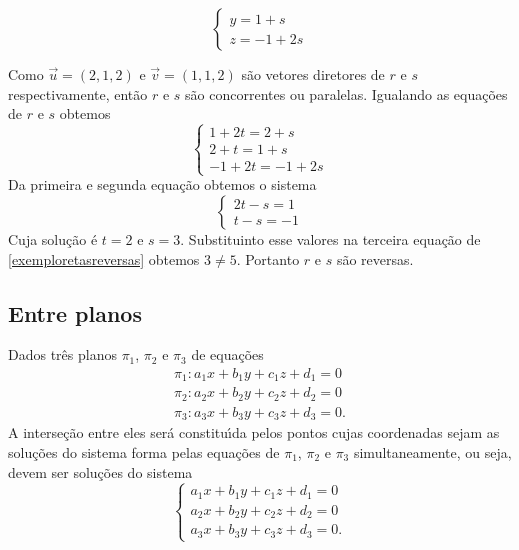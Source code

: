 \begin{exemplos}
\begin{enumerate}
\[\begin{cases}
                y = 1 + s\\
                z = -1 + 2s
            \end{cases}
        \]
        \begin{solucao}
            Como $\vec{u} = (2,1,2)$ e $\vec{v} = (1,1,2)$ s\~ao vetores diretores de $r$ e $s$ respectivamente, ent\~ao $r$ e $s$ s\~ao concorrentes ou paralelas. Igualando as equa\c{c}\~oes de $r$ e $s$ obtemos
            \begin{equation}\label{exemploretasreversas}
                \begin{cases}
                    1 + 2t = 2 + s\\
                    2 + t = 1 + s\\
                    -1 + 2t = -1 + 2s    
                \end{cases}
            \end{equation}
            Da primeira e segunda equa\c{c}\~ao obtemos o sistema
            \[
                \begin{cases}
                    2t - s = 1\\
                    t - s = -1
                \end{cases}
            \]
            Cuja solu\c{c}\~ao \'e $t = 2$ e $s = 3$. Substituinto esse valores na terceira equa\c{c}\~ao de \eqref{exemploretasreversas} obtemos $3 \ne 5$. Portanto $r$ e $s$ s\~ao reversas.
        \end{solucao}
    \end{enumerate}
\end{exemplos}

\subsection{Entre planos} %
\label{sub:entre_planos}
Dados tr\^es planos $\pi_1$, $\pi_2$ e $\pi_3$ de equa\c{c}\~oes
\begin{align*}
    \pi_1 : a_1x + b_1y + c_1z + d_1 = 0\\
    \pi_2 : a_2x + b_2y + c_2z + d_2 = 0\\
    \pi_3 : a_3x + b_3y + c_3z + d_3 = 0.
\end{align*}
A interse\c{c}\~ao entre eles ser\'a constitu{\'\i}da pelos pontos cujas coordenadas sejam as solu\c{c}\~oes do sistema forma pelas equa\c{c}\~oes de $\pi_1$, $\pi_2$ e $\pi_3$ simultaneamente, ou seja, devem ser solu\c{c}\~oes do sistema
\[
    \begin{cases}
        a_1x + b_1y + c_1z + d_1 = 0\\
        a_2x + b_2y + c_2z + d_2 = 0\\
        a_3x + b_3y + c_3z + d_3 = 0.
    \end{cases}
\]

